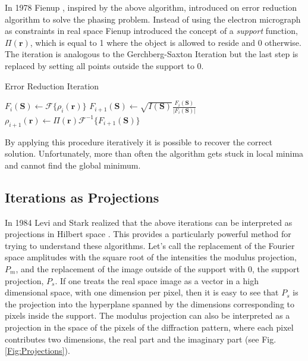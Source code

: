 In 1978 Fienup \cite{Fienup1978Reconstruction}, inspired by the above algorithm, introduced on error
reduction algorithm to solve the phasing problem. Instead of using the electron
micrograph as constraints in real space Fienup introduced the concept of a {\em
  support} function, $\Pi(\mathbf r)$, which is equal to 1 where the
object is allowed to reside and 0 otherwise. 
The iteration is analogous to the Gerchberg-Saxton Iteration but the last step is replaced
by setting all points outside the support to 0.
\begin{algorithm}
\caption{Error Reduction Iteration}
\begin{algorithmic}
  \STATE $F_{i}(\mathbf S) \gets \mathscr{F}\{\rho_i(\mathbf r)\}$
  \STATE $F_{i+1}(\mathbf S) \gets \sqrt{I(\mathbf S)} \frac{F_i(\mathbf S)}{|F_i(\mathbf S)|}$
  \STATE $\rho_{i+1}(\mathbf r) \gets \Pi(\mathbf r) \mathscr{F}^{-1}\{F_{i+1}(\mathbf S)\}$
\end{algorithmic}
\end{algorithm}

By applying this procedure iteratively it is possible to recover the correct
solution. 
Unfortunately, 
more than often 
 the algorithm
 gets stuck in
local minima and cannot find the global minimum.

\subsection{Iterations as Projections}

In 1984 Levi and Stark realized that the above iterations can be
interpreted as projections in Hilbert space \cite{Levi1984Image}. This provides a
particularly powerful method for trying to understand these algorithms.
Let's call the replacement of the Fourier space amplitudes with the square root of
the intensities the modulus projection, $P_m$, and the replacement of the image
outside of the support with 0, the support projection, $P_s$. If one treats the
real space image as a vector in a high dimensional space, with one dimension per
pixel, then it is easy to see that $P_s$ is the projection into the hyperplane
spanned by the dimensions corresponding to pixels inside the support. The
modulus projection can also be interpreted as a projection in the space of the
pixels of the diffraction pattern, where each pixel contributes two dimensions,
the real part and the imaginary part (see Fig. \ref{Fig:Projections}). 

